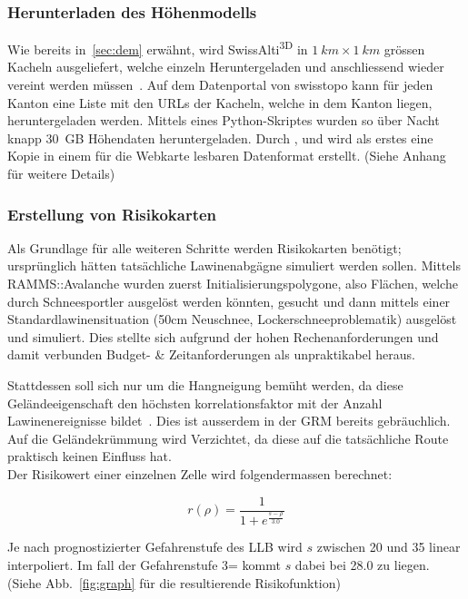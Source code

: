 \begin{multicols}{2}
\subsubsection{Herunterladen des Höhenmodells}

Wie bereits in\ \ref{sec:dem} erwähnt, wird SwissAlti\textsuperscript{3D} in $\qty{1}{km} \times \qty{1}{km}$ grössen Kacheln ausgeliefert, welche einzeln Heruntergeladen und anschliessend wieder vereint werden müssen~\cite{alti3dprod}. Auf dem Datenportal von swisstopo kann für jeden Kanton eine Liste mit den URLs der Kacheln, welche in dem Kanton liegen, heruntergeladen werden. Mittels eines Python-Skriptes wurden so über Nacht knapp \qty{30}{GB} Höhendaten heruntergeladen. Durch ,  und  wird als erstes eine Kopie in einem für die Webkarte lesbaren Datenformat erstellt. (Siehe Anhang für weitere Details)

\subsubsection{Erstellung von Risikokarten}

Als Grundlage für alle weiteren Schritte werden Risikokarten benötigt; ursprünglich hätten tatsächliche Lawinenabgägne simuliert werden sollen. Mittels RAMMS::Avalanche wurden zuerst Initialisierungspolygone, also Flächen, welche durch Schneesportler ausgelöst werden könnten, gesucht und dann mittels einer Standardlawinensituation (50cm Neuschnee, Lockerschneeproblematik) ausgelöst und simuliert. Dies stellte sich aufgrund der hohen Rechenanforderungen und damit verbunden Budget- \& Zeitanforderungen als unpraktikabel heraus.

Stattdessen soll sich nur um die Hangneigung bemüht werden, da diese Geländeeigenschaft den höchsten korrelationsfaktor mit der Anzahl Lawinenereignisse bildet~\cite{arpddatasetdocs}. Dies ist ausserdem in der GRM bereits gebräuchlich. Auf die Geländekrümmung wird Verzichtet, da diese auf die tatsächliche Route praktisch keinen Einfluss hat.\\
Der Risikowert einer einzelnen Zelle wird folgendermassen berechnet:

\[
r(\rho) = \frac{1}{1 + e^{\frac{s-\rho}{3.0}}}
\]

Je nach prognostizierter Gefahrenstufe des LLB wird $s$ zwischen 20 und 35 linear interpoliert. Im fall der Gefahrenstufe 3= kommt $s$ dabei bei 28.0 zu liegen. (Siehe Abb.~\ref{fig:graph} für die resultierende Risikofunktion)


\end{multicols}
